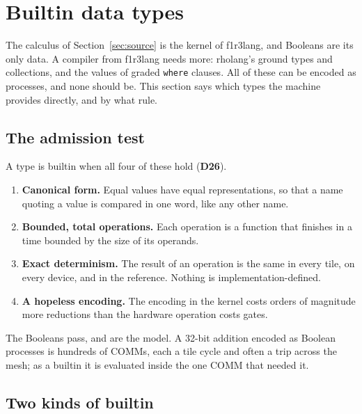 \documentclass[10.5pt,a4paper]{extarticle}
\newcommand{\kw}[1]{\texttt{#1}}
\newcommand{\dec}[1]{\textbf{D#1}}
\theoremstyle{definition}
\theoremstyle{remark}
\begin{document}
\section{Builtin data types}\label{sec:data}

The calculus of Section~\ref{sec:source} is the kernel of f1r3lang, and
Booleans are its only data. A compiler from f1r3lang needs more: rholang's
ground types and collections, and the values of graded \kw{where} clauses.
All of these can be encoded as processes, and none should be. This section
says which types the machine provides directly, and by what rule.

\subsection{The admission test}\label{sec:admission}

A type is builtin when all four of these hold (\dec{26}).
\begin{enumerate}
\item \textbf{Canonical form.} Equal values have equal representations, so
that a name quoting a value is compared in one word, like any other name.
\item \textbf{Bounded, total operations.} Each operation is a function that
finishes in a time bounded by the size of its operands.
\item \textbf{Exact determinism.} The result of an operation is the same in
every tile, on every device, and in the reference. Nothing is
implementation-defined.
\item \textbf{A hopeless encoding.} The encoding in the kernel costs orders
of magnitude more reductions than the hardware operation costs gates.
\end{enumerate}
The Booleans pass, and are the model. A 32-bit addition encoded as Boolean
processes is hundreds of COMMs, each a tile cycle and often a trip across the
mesh; as a builtin it is evaluated inside the one COMM that needed it.

\subsection{Two kinds of builtin}\label{sec:kinds}
\end{document}
